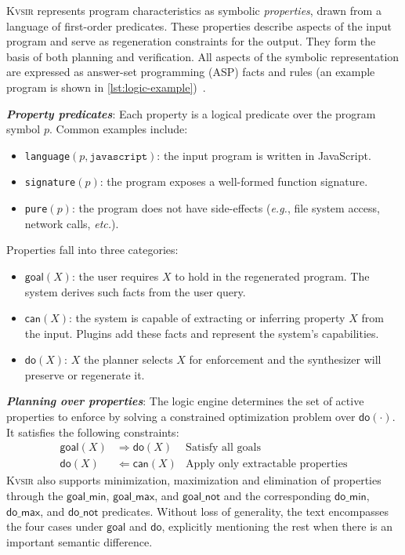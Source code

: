 \documentclass[noacm,sigplan]{acmart}
\def\eg{{\em e.g.}, }
\def\etc{{\em etc.}\xspace}
\newcommand{\sys}{{\scshape Kv{\textalpha}sir}\xspace}
\newcommand{\heading}[1]{\vspace{2pt}\noindent\textbf{\emph{#1}}:\enspace}
\begin{document}
\sys represents program characteristics as symbolic \emph{properties}, drawn from a language of first-order predicates.
These properties describe aspects of the input program and serve as regeneration constraints for the output.
They form the basis of both planning and verification.
All aspects of the symbolic representation are expressed as answer-set programming (ASP) facts and rules (an example program is shown in \cref{lst:logic-example})~\cite{Eiter_2009}.

\heading{Property predicates}
Each property is a logical predicate over the program symbol $p$. Common examples include:
\begin{itemize}
  \item \texttt{language}$(p, \texttt{javascript})$: the input program is written in JavaScript.
  \item \texttt{signature}$(p)$: the program exposes a well-formed function signature.
  \item \texttt{pure}$(p)$: the program does not have side-effects (\eg file system access, network calls, \etc).
\end{itemize}

Properties fall into three categories:
\begin{itemize}
  \item $\mathsf{goal}(X)$: the user requires $X$ to hold in the regenerated program. The system derives such facts from the user query.
  \item $\mathsf{can}(X)$: the system is capable of extracting or inferring property $X$ from the input. Plugins add these facts and represent the system's capabilities.
  \item $\mathsf{do}(X)$: $X$ the planner selects $X$ for enforcement and the synthesizer will preserve or regenerate it. 
\end{itemize}

\heading{Planning over properties}
The logic engine determines the set of active properties to enforce by solving a constrained optimization problem over $\mathsf{do}(\cdot)$. It satisfies the following constraints:
\begin{align*}
  \mathsf{goal}(X) &\Rightarrow \mathsf{do}(X) &\text{Satisfy all goals} \\
  \mathsf{do}(X) &\Leftarrow \mathsf{can}(X) &\text{Apply only extractable properties}
\end{align*}
\sys also supports minimization, maximization and elimination of properties
through the $\mathsf{goal\_min}$, $\mathsf{goal\_max}$, and $\mathsf{goal\_not}$ and the corresponding $\mathsf{do\_min}$, $\mathsf{do\_max}$, and $\mathsf{do\_not}$ predicates.
Without loss of generality, the text encompasses the four cases under $\mathsf{goal}$ and $\mathsf{do}$, explicitly mentioning the rest when there is an important semantic difference.
\end{document}
